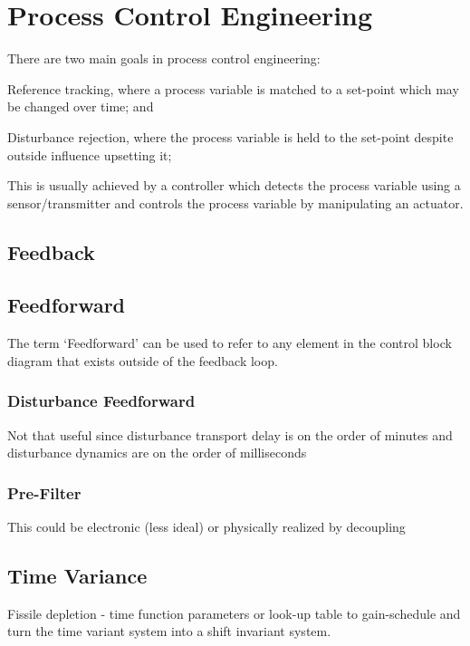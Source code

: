 \chapter{Process Control Engineering}
\label{Chapter:Controls}

There are two main goals in process control engineering:
\begin{enumerate*}[label=\arabic*)]
    \item Reference tracking, where a process variable is matched to a set-point which may be changed over time; and 
    \item Disturbance rejection, where the process variable is held to the set-point despite outside influence upsetting it;
\end{enumerate*}
This is usually achieved by a controller which detects the process variable using a sensor/transmitter and controls the process variable by manipulating an actuator. 

\section{Feedback}

\section{Feedforward}
The term `Feedforward' can be used to refer to any element in the control block diagram that exists outside of the feedback loop.

\subsection{Disturbance Feedforward}
Not that useful since disturbance transport delay is on the order of minutes and disturbance dynamics are on the order of milliseconds

\subsection{Pre-Filter}
This could be electronic (less ideal) or physically realized by decoupling 


\section{Time Variance}
Fissile depletion - time function parameters or look-up table to gain-schedule and turn the time variant system into a shift invariant system.

